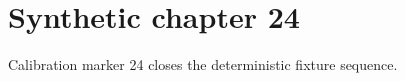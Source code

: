 \chapter{Synthetic chapter 24}\label{chap:24}
Calibration marker 24 closes the deterministic fixture sequence.
